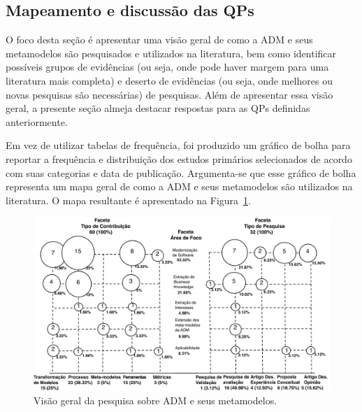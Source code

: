 \subsection{Mapeamento e discussão das QPs}\label{subsec:mapeamento_e_dis}

O foco desta seção é apresentar uma visão geral de como a ADM e seus metamodelos são pesquisados e utilizados na literatura, bem como identificar possíveis grupos de evidências (ou seja, onde pode haver margem para uma literatura mais completa) e deserto de evidências (ou seja, onde melhores ou novas pesquisas são necessárias) de pesquisas. Além de apresentar essa visão geral, a presente seção almeja destacar respostas para as QPs definidas anteriormente.

Em vez de utilizar tabelas de frequência, foi produzido um gráfico de bolha para reportar a frequência e distribuição dos estudos primários selecionados de acordo com suas categorias e data de publicação. Argumenta-se que esse gráfico de bolha representa um mapa geral de como a ADM e seus metamodelos são utilizados na literatura. O mapa resultante é apresentado na Figura~\ref{fig:mapa_mapeamento_sistematico}.


\begin{figure}[h]
 \caption{Visão geral da pesquisa sobre ADM e seus metamodelos.}
 \label{fig:mapa_mapeamento_sistematico}
 \centering
 \includegraphics[scale=0.8]{images/MapaMS_port}
 \fautor
\end{figure}

